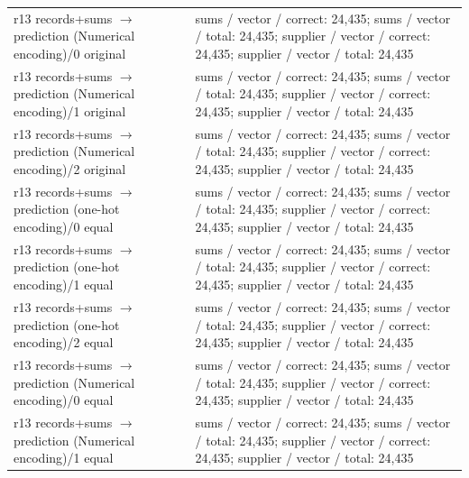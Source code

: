 \begin{longtable}{@{}>{\raggedright\arraybackslash}p{1.800in}>{\raggedright\arraybackslash}p{4.200in}@{}}
r13 records+sums $\to$ prediction (Numerical encoding)/\allowbreak{}0 original & sums /\allowbreak{} vector /\allowbreak{} correct: 24,435; sums /\allowbreak{} vector /\allowbreak{} total: 24,435; supplier /\allowbreak{} vector /\allowbreak{} correct: 24,435; supplier /\allowbreak{} vector /\allowbreak{} total: 24,435 \\
r13 records+sums $\to$ prediction (Numerical encoding)/\allowbreak{}1 original & sums /\allowbreak{} vector /\allowbreak{} correct: 24,435; sums /\allowbreak{} vector /\allowbreak{} total: 24,435; supplier /\allowbreak{} vector /\allowbreak{} correct: 24,435; supplier /\allowbreak{} vector /\allowbreak{} total: 24,435 \\
r13 records+sums $\to$ prediction (Numerical encoding)/\allowbreak{}2 original & sums /\allowbreak{} vector /\allowbreak{} correct: 24,435; sums /\allowbreak{} vector /\allowbreak{} total: 24,435; supplier /\allowbreak{} vector /\allowbreak{} correct: 24,435; supplier /\allowbreak{} vector /\allowbreak{} total: 24,435 \\
r13 records+sums $\to$ prediction (one-hot encoding)/\allowbreak{}0 equal & sums /\allowbreak{} vector /\allowbreak{} correct: 24,435; sums /\allowbreak{} vector /\allowbreak{} total: 24,435; supplier /\allowbreak{} vector /\allowbreak{} correct: 24,435; supplier /\allowbreak{} vector /\allowbreak{} total: 24,435 \\
r13 records+sums $\to$ prediction (one-hot encoding)/\allowbreak{}1 equal & sums /\allowbreak{} vector /\allowbreak{} correct: 24,435; sums /\allowbreak{} vector /\allowbreak{} total: 24,435; supplier /\allowbreak{} vector /\allowbreak{} correct: 24,435; supplier /\allowbreak{} vector /\allowbreak{} total: 24,435 \\
r13 records+sums $\to$ prediction (one-hot encoding)/\allowbreak{}2 equal & sums /\allowbreak{} vector /\allowbreak{} correct: 24,435; sums /\allowbreak{} vector /\allowbreak{} total: 24,435; supplier /\allowbreak{} vector /\allowbreak{} correct: 24,435; supplier /\allowbreak{} vector /\allowbreak{} total: 24,435 \\
r13 records+sums $\to$ prediction (Numerical encoding)/\allowbreak{}0 equal & sums /\allowbreak{} vector /\allowbreak{} correct: 24,435; sums /\allowbreak{} vector /\allowbreak{} total: 24,435; supplier /\allowbreak{} vector /\allowbreak{} correct: 24,435; supplier /\allowbreak{} vector /\allowbreak{} total: 24,435 \\
r13 records+sums $\to$ prediction (Numerical encoding)/\allowbreak{}1 equal & sums /\allowbreak{} vector /\allowbreak{} correct: 24,435; sums /\allowbreak{} vector /\allowbreak{} total: 24,435; supplier /\allowbreak{} vector /\allowbreak{} correct: 24,435; supplier /\allowbreak{} vector /\allowbreak{} total: 24,435 \\

\end{longtable}

